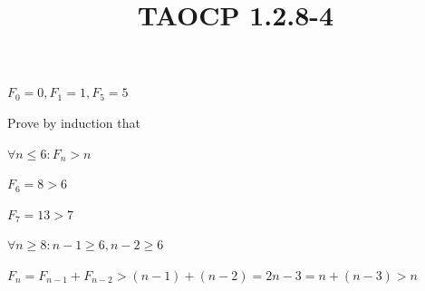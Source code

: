 \documentclass{article}
\title{TAOCP 1.2.8\mbox{-}4}
\begin{document}
\maketitle

\( F_{0} = 0, F_{1} = 1, F_{5} = 5 \)

Prove by induction that

\( \forall n \leq 6: F_{n} > n \)

\( F_{6} = 8 > 6 \)

\( F_{7} = 13 > 7 \)

\( \forall n \geq 8: n - 1 \geq 6, n - 2 \geq 6 \)

\( F_{n} = F_{n-1} + F_{n-2} > (n - 1) + (n - 2) = 2n-3 = n + (n-3) > n \)
\end{document}
